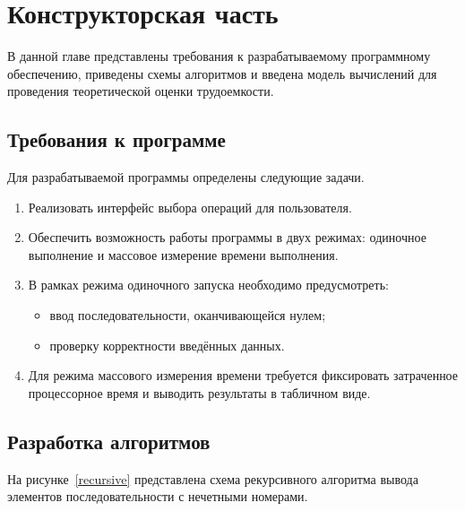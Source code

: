 \chapter{Конструкторская часть}

В данной главе представлены требования к разрабатываемому программному обеспечению, приведены схемы алгоритмов и введена модель вычислений для проведения теоретической оценки трудоемкости.

\section{Требования к программе}

Для разрабатываемой программы определены следующие задачи.
\begin{enumerate}
	\item Реализовать интерфейс выбора операций для пользователя.
	\item Обеспечить возможность работы программы в двух режимах: одиночное выполнение и массовое измерение времени выполнения.
	\item В рамках режима одиночного запуска необходимо предусмотреть:
	\begin{itemize}
		\item ввод последовательности, оканчивающейся нулем;
		\item проверку корректности введённых данных.
	\end{itemize}
	\item Для режима массового измерения времени требуется фиксировать затраченное процессорное время и выводить результаты в табличном виде.
\end{enumerate}

\section{Разработка алгоритмов}

На рисунке~\ref{recursive} представлена схема рекурсивного алгоритма вывода элементов последовательности с нечетными номерами.

